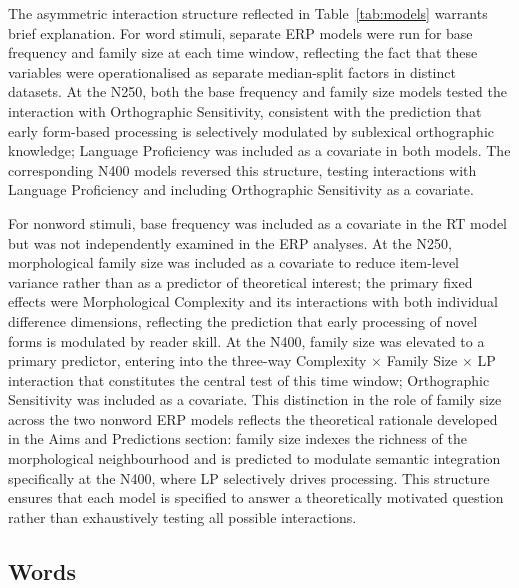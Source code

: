 \documentclass[utf8]{FrontiersinHarvard} %
\begin{document}
	The asymmetric interaction structure reflected in Table~\ref{tab:models} warrants brief explanation. For word stimuli, separate ERP models were run for base frequency and family size at each time window, reflecting the fact that these variables were operationalised as separate median-split factors in distinct datasets. At the N250, both the base frequency and family size models tested the interaction with Orthographic Sensitivity, consistent with the prediction that early form-based processing is selectively modulated by sublexical orthographic knowledge; Language Proficiency was included as a covariate in both models. The corresponding N400 models reversed this structure, testing interactions with Language Proficiency and including Orthographic Sensitivity as a covariate.
	
	For nonword stimuli, base frequency was included as a covariate in the RT model but was not independently examined in the ERP analyses. At the N250, morphological family size was included as a covariate to reduce item-level variance rather than as a predictor of theoretical interest; the primary fixed effects were Morphological Complexity and its interactions with both individual difference dimensions, reflecting the prediction that early processing of novel forms is modulated by reader skill. At the N400, family size was elevated to a primary predictor, entering into the three-way Complexity $\times$ Family Size $\times$ LP interaction that constitutes the central test of this time window; Orthographic Sensitivity was included as a covariate. This distinction in the role of family size across the two nonword ERP models reflects the theoretical rationale developed in the Aims and Predictions section: family size indexes the richness of the morphological neighbourhood and is predicted to modulate semantic integration specifically at the N400, where LP selectively drives processing. This structure ensures that each model is specified to answer a theoretically motivated question rather than exhaustively testing all possible interactions.
	
	\subsection{Words}
	
\end{document}

